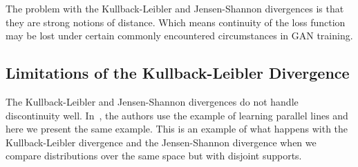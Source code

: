 The problem with the Kullback-Leibler and Jensen-Shannon divergences
is that they are strong notions of distance. Which means continuity of
the loss function may be lost under certain commonly encountered
circumstances in GAN training.

\subsection{Limitations of the Kullback-Leibler Divergence}

The Kullback-Leibler and Jensen-Shannon divergences do not handle
discontinuity well. In~\cite{ref:arjovsky-2017}, the authors use the
example of learning parallel lines and here we present the same
example. This is an example of what happens with the Kullback-Leibler
divergence and the Jensen-Shannon divergence when we compare
distributions over the same space but with disjoint supports.

